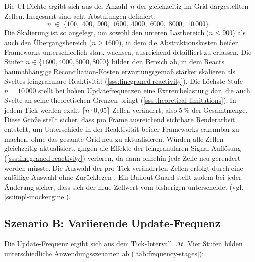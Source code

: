 Die UI-Dichte ergibt sich aus der Anzahl~$n$ der gleichzeitig im Grid dargestellten Zellen. Insgesamt sind acht Abstufungen definiert:
\begin{equation}
	n \;\in\; \{100,\;400,\;900,\;1600,\;4000,\;6000,\;8000,\;10\,000\}
\end{equation}
 Die Skalierung ist so angelegt, um sowohl den unteren Lastbereich ($n \leq 900$) als auch den Übergangsbereich ($n \geq 1600$), in dem die Abstraktionskosten beider Frameworks unterschiedlich stark wachsen, ausreichend detailliert zu erfassen. Die Stufen $n \in \{1600, 4000, 6000, 8000\}$ bilden den Bereich ab, in dem Reacts baumabhängige Reconciliation-Kosten erwartungsgemäß stärker skalieren als Sveltes feingranulare Reaktivität (\cref{sss:finegraned-reactivity}). Die höchste Stufe $n = 10\,000$ stellt bei hohen Updatefrequenzen eine Extrembelastung dar, die auch Svelte an seine theoretischen Grenzen bringt (\cref{sss:theoretical-limitations}). In jedem Tick werden exakt $\lceil n \cdot 0{,}05 \rceil$ Zellen verändert, also 5\,\% der Gesamtmenge. Diese Größe stellt sicher, dass pro Frame ausreichend sichtbare Renderarbeit entsteht, um Unterschiede in der Reaktivität beider Frameworks erkennbar zu machen, ohne das gesamte Grid neu zu aktualisieren. Würden alle Zellen gleichzeitig aktualisiert, gingen die Effekte der feingranularen Signal-Auflösung (\cref{sss:finegraned-reactivity}) verloren, da dann ohnehin jede Zelle neu gerendert werden müsste. Die Auswahl der pro Tick veränderten Zellen erfolgt durch eine zufällige Auswahl ohne Zurücklegen \cite{knuth-taocp2-1998}. Ein Bailout-Guard stellt zudem bei jeder Änderung sicher, dass sich der neue Zellwert vom bisherigen unterscheidet (vgl. \cref{ss:impl-mockengine}).

\subsection{Szenario B: Variierende Update-Frequenz}
\label{ss:scenario-b}

Die Update-Frequenz ergibt sich aus dem Tick-Intervall~$\Delta t$. Vier Stufen bilden unterschiedliche Anwendungsszenarien ab (\cref{tab:frequency-stages}):

